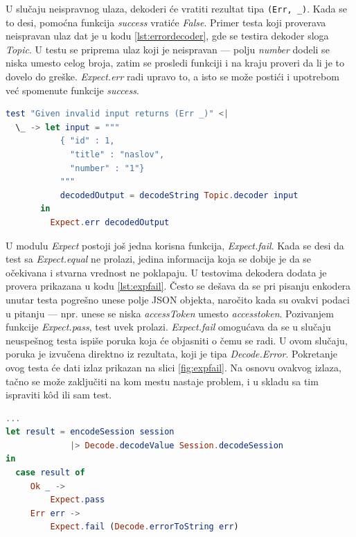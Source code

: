 \documentclass[12pt,oneside]{memoir}
\begin{document}
\par U slučaju neispravnog ulaza, dekoderi će vratiti rezultat tipa \texttt{(Err, \_)}. Kada se to desi, pomoćna funkcija \emph{success} vratiće \emph{False}. Primer testa koji proverava neispravan ulaz dat je u kodu \ref{lst:errordecoder}, gde se testira dekoder sloga \emph{Topic}. U testu se priprema ulaz koji je neispravan --- polju \emph{number} dodeli se niska umesto celog broja, zatim se prosledi funkciji i na kraju proveri da li je to dovelo do greške. \emph{Expect.err} radi upravo to, a isto se može postići i upotrebom već spomenute funkcije \emph{success}.

\begin{minipage}{\linewidth}
\begin{lstlisting}[language=elm, basicstyle=\small, caption={Implementacija testa koji izaziva grešku},captionpos=b, label={lst:errordecoder}]
test "Given invalid input returns (Err _)" <|
  \_ -> let input = """
           { "id" : 1,
             "title" : "naslov",
             "number" : "1"}
           """
           decodedOutput = decodeString Topic.decoder input
       in 
         Expect.err decodedOutput
\end{lstlisting}
\end{minipage}

\par U modulu \emph{Expect} postoji još jedna korisna funkcija, \emph{Expect.fail}. Kada se desi da test sa \emph{Expect.equal} ne prolazi, jedina informacija koja se dobije je da se očekivana i stvarna vrednost ne poklapaju. U testovima dekodera dodata je provera prikazana u kodu \ref{lst:expfail}. Često se dešava da se pri pisanju enkodera unutar testa pogrešno unese polje JSON objekta, naročito kada su ovakvi podaci u pitanju --- npr. unese se niska \emph{accessToken} umesto \emph{access{\textunderscore}token}. Pozivanjem funkcije \emph{Expect.pass}, test uvek prolazi. \emph{Expect.fail} omogućava da se u slučaju neuspešnog testa ispiše poruka koja će objasniti o čemu se radi. U ovom slučaju, poruka je izvučena direktno iz rezultata, koji je tipa \emph{Decode.Error}. Pokretanje ovog testa će dati izlaz prikazan na slici \ref{fig:expfail}. Na osnovu ovakvog izlaza, tačno se može zaključiti na kom mestu nastaje problem, i u skladu sa tim ispraviti k\^{o}d ili sam test.

\begin{minipage}{\linewidth}
\begin{lstlisting}[language=elm, basicstyle=\small, caption={Implementacija testa koji izbacuje poruku u slučaju neuspeha},captionpos=b, label={lst:expfail}]
...
let result = encodeSession session 
             |> Decode.decodeValue Session.decodeSession
in 
  case result of 
     Ok _ -> 
         Expect.pass
     Err err -> 
         Expect.fail (Decode.errorToString err)
\end{lstlisting}
\end{minipage}
\end{document}
